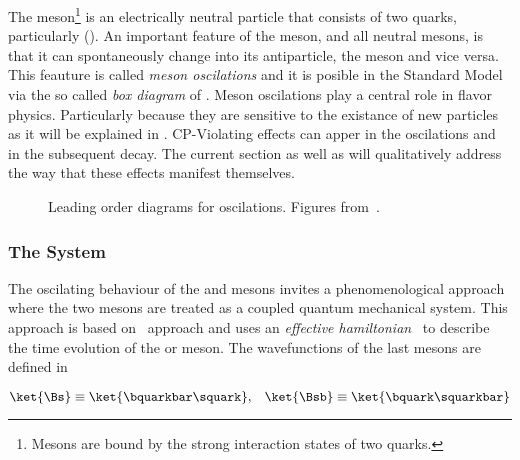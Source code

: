 

The \Bs meson\footnote{Mesons are bound by the strong interaction states of two quarks.} is an electrically neutral
particle that consists of two quarks, particularly (\bquarkbar\squark). An important feature of
the \Bs meson, and all neutral mesons, is that it can spontaneously change into its antiparticle,
the \Bsb meson and vice versa. This feauture is called {\it meson oscilations} and it is posible
in the Standard Model via the so called {\it box diagram} of .
Meson oscilations play a central role in flavor physics. Particularly because they are sensitive to the
existance of new particles as it will be explained in . CP-Violating effects can
apper in the \BBbarSyst oscilations and in the subsequent decay. The current section as well
as  will qualitatively address the way that these effects manifest themselves.

\begin{figure}[h]
  \centering
  \begin{subfigure}{0.5\textwidth}
    \centering
    {\sffamily }
    \caption{}
    \label{bs_box_1}
  \end{subfigure}%
  \begin{subfigure}{0.5\textwidth}
    \centering
    {\sffamily }
    \caption{}
    \label{bs_box_2}
  \end{subfigure}
  \caption{Leading order diagrams for \BBbarSyst oscilations. Figures from~\cite{jeroenThesis}.}
  \label{bs_box}
\end{figure}

\subsubsection{The \BBbarSyst System}

The oscilating behaviour of the \Bs and \Bsb mesons invites a phenomenological approach
where the two mesons are treated as a coupled quantum mechanical system. This approach
is based on~\cite{Weisskopf:1930au,Weisskopf:1930ps} approach and uses an {\it effective hamiltonian}~\cite{eff-hamiltonian-bs-syst,DeBruyn-thesis}
to describe the time evolution of the \Bs or \Bsb meson. The wavefunctions of the last mesons
are defined in 

\begin{equation}
\ket{\Bs}  \equiv  \ket{\bquarkbar\squark}, \;\;\; \ket{\Bsb} \equiv  \ket{\bquark\squarkbar}
\label{bs_wavefunctions}
\end{equation}

